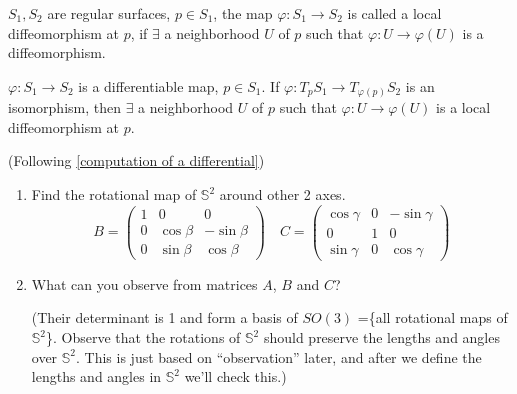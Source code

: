 \begin{definition}
    \(S_1,S_2\) are regular surfaces, \(p\in S_1\), the map 
    \(\varphi\colon S_1\to S_2\) is called a local 
    diffeomorphism at \(p\), if \(\exists\) a neighborhood
    \(U\) of \(p\) such that \(\varphi\colon U\to \varphi(U)\)
    is a diffeomorphism.
\end{definition}
\begin{proposition}
    \(\varphi\colon S_1\to S_2\) is a differentiable map, 
    \(p\in S_1\). If \(\varphi\colon T_p S_1\to T_{\varphi(p)}S_2\)
    is an isomorphism, then \(\exists\) a neighborhood \(U\) of 
    \(p\) such that \(\varphi\colon U\to \varphi(U)\) is a local 
    diffeomorphism at \(p\).
\end{proposition}
\begin{exercise} (Following \cref{computation of a differential})
    \begin{enumerate}[(1)]
        \item Find the rotational map of \(\mathbb{S}^2\) around 
        other 2 axes.
        \[
            B=\begin{pmatrix}
                1&0&0\\
                0&\cos\beta&-\sin\beta\\
                0&\sin\beta&\cos\beta
            \end{pmatrix}\quad
            C=\begin{pmatrix}
                \cos\gamma&0&-\sin\gamma\\
                0&1&0\\
                \sin\gamma&0&\cos\gamma
            \end{pmatrix}    
        \]
        \item What can you observe from matrices \(A\), \(B\) and 
        \(C\)? 

        (Their determinant is 1 and form a basis of \(SO(3)\)
        =\{all rotational maps of \(\mathbb{S}^2\)\}. Observe that
        the rotations of \(\mathbb{S}^2\) should preserve the 
        lengths and angles over \(\mathbb{S}^2\). This is just 
        based on ``observation'' later, and after we define 
        the lengths and angles in \(\mathbb{S}^2\) we'll 
        check this.)
    \end{enumerate} 
\end{exercise}

